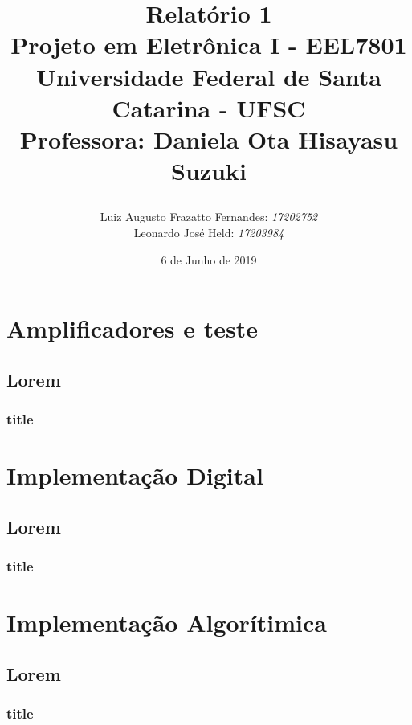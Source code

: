 \documentclass[11pt,a4paper]{report}
\title{Relatório 1  \\
	Projeto em Eletrônica I - EEL7801 \\ \vfill
	\normalsize{Universidade Federal de Santa Catarina - UFSC \\
		Professora: Daniela Ota Hisayasu Suzuki}
	\author{
		{Luiz Augusto Frazatto Fernandes: \it{17202752}} \\
		{Leonardo José Held: \it{17203984}}
	}
}
\date{6 de Junho de 2019}
\begin{document}
	\maketitle
	\setcounter{chapter}{0}
	\chapter{Amplificadores e teste}
	\section{Lorem}
	\subsection{title}
	
	
	
	\chapter{Implementação Digital}
	
	\section{Lorem}
	\subsection{title}
	
	\chapter{Implementação Algorítimica}
	
	
	\section{Lorem}
	\subsection{title}
	
\end{document}
